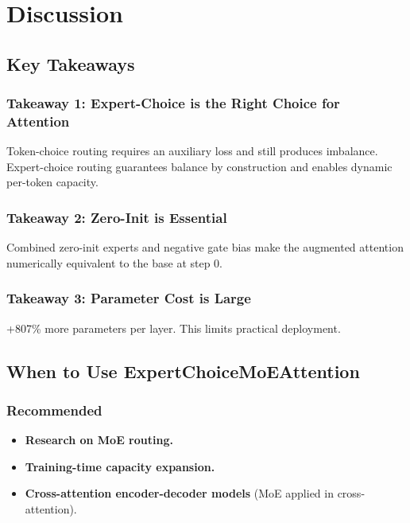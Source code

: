 \section{Discussion}

\subsection{Key Takeaways}

\subsubsection{Takeaway 1: Expert-Choice is the Right Choice for Attention}

Token-choice routing requires an auxiliary loss and still produces 
imbalance. Expert-choice routing guarantees balance by construction and 
enables dynamic per-token capacity.

\subsubsection{Takeaway 2: Zero-Init is Essential}

Combined zero-init experts and negative gate bias make the augmented 
attention numerically equivalent to the base at step 0.

\subsubsection{Takeaway 3: Parameter Cost is Large}

+807\% more parameters per layer. This limits practical deployment.

\subsection{When to Use ExpertChoiceMoEAttention}

\subsubsection{Recommended}
\begin{itemize}
\item \textbf{Research on MoE routing.}
\item \textbf{Training-time capacity expansion.}
\item \textbf{Cross-attention encoder-decoder models} (MoE applied in cross-attention).

\end{itemize}
